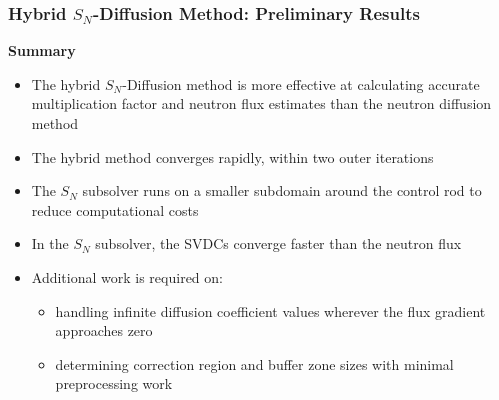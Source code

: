 \begin{frame}
  \frametitle{Hybrid $S_N$-Diffusion Method: Preliminary Results}
  \begin{block}{\textbf{Summary}}
    \begin{itemize}
      \item The hybrid $S_N$-Diffusion method is more effective at calculating accurate
        multiplication factor and neutron flux estimates than the neutron diffusion method
      \item The hybrid method converges rapidly, within two outer iterations
      \item The $S_N$ subsolver runs on a smaller subdomain around the control rod to reduce
        computational costs
      \item In the $S_N$ subsolver, the SVDCs converge faster than the neutron flux
      \item Additional work is required on:
        \begin{itemize}
          \item handling infinite diffusion coefficient values wherever the flux gradient
            approaches zero
          \item determining correction region and buffer zone sizes with minimal preprocessing work
        \end{itemize}
    \end{itemize}
  \end{block}
\end{frame}
